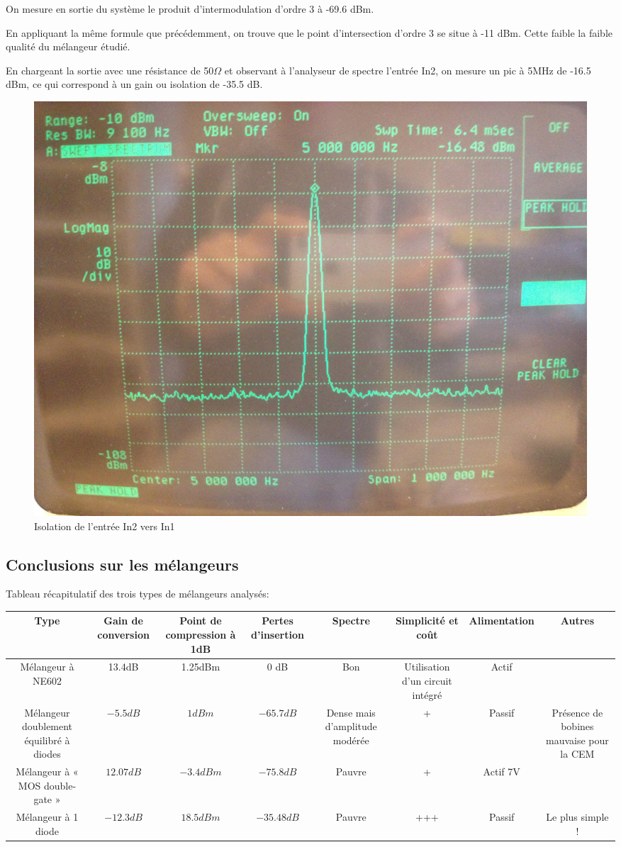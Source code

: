 \documentclass{article}
\begin{document}
On mesure en sortie du système le produit d'intermodulation d'ordre 3 à -69.6 dBm.

En appliquant la même formule que précédemment, on trouve que le point d'intersection d'ordre 3 se situe à -11 dBm. Cette faible la faible qualité du mélangeur étudié.



En chargeant la sortie avec une résistance de 50$\Omega$ et observant à l'analyseur de spectre l'entrée In2, on mesure un pic à 5MHz de -16.5 dBm, ce qui correspond à un gain ou isolation de -35.5 dB.

\begin{figure}[h!]
	\centering
	\includegraphics[width=.7\textwidth]{11_3_5}
	\caption{Isolation de l'entrée In2 vers In1}
	\label{fig:11_3_5}
\end{figure}




\subsection{Conclusions sur les mélangeurs}


Tableau récapitulatif des trois types de mélangeurs analysés:

\begin{tabular}{|c|c|c|c|c|c|c|c|}
\hline Type & Gain de conversion& Point de compression à 1dB & Pertes d'insertion& Spectre& Simplicité et coût& Alimentation& Autres \\
\hline Mélangeur à NE602 & 13.4dB & 1.25dBm & 0 dB & Bon & Utilisation d'un circuit intégré & Actif \\
\hline Mélangeur doublement équilibré à diodes & $-5.5dB$ & $1dBm$  & $-65.7dB$ & Dense mais d'amplitude modérée & + & Passif& Présence de bobines mauvaise pour la CEM \\ 
\hline Mélangeur à « MOS double-gate » & $12.07dB$ & $-3.4dBm$ & $-75.8dB$ & Pauvre & + & Actif 7V&   \\ 
\hline Mélangeur à 1 diode & $-12.3dB$ & $18.5dBm$ & $-35.48dB$ & Pauvre & +++ & Passif& Le plus simple ! \\ 
\hline 
\end{tabular} 
\end{document}
